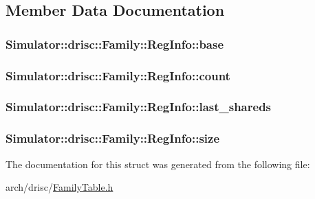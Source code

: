 \subsection{Member Data Documentation}
\hypertarget{struct_simulator_1_1drisc_1_1_family_1_1_reg_info_af6db1a141f61cce61b2f2dd993d227de}{
\subsubsection[{base}]{ Simulator\+::drisc\+::\+Family\+::\+Reg\+Info\+::base}}\label{struct_simulator_1_1drisc_1_1_family_1_1_reg_info_af6db1a141f61cce61b2f2dd993d227de}
\hypertarget{struct_simulator_1_1drisc_1_1_family_1_1_reg_info_acc2ad70f3b688fa40795ba2289115970}{
\subsubsection[{count}]{ Simulator\+::drisc\+::\+Family\+::\+Reg\+Info\+::count}}\label{struct_simulator_1_1drisc_1_1_family_1_1_reg_info_acc2ad70f3b688fa40795ba2289115970}
\hypertarget{struct_simulator_1_1drisc_1_1_family_1_1_reg_info_ae04720534956ec61ba4fad57b8e274ea}{
\subsubsection[{last\+\_\+shareds}]{ Simulator\+::drisc\+::\+Family\+::\+Reg\+Info\+::last\+\_\+shareds}}\label{struct_simulator_1_1drisc_1_1_family_1_1_reg_info_ae04720534956ec61ba4fad57b8e274ea}
\hypertarget{struct_simulator_1_1drisc_1_1_family_1_1_reg_info_a8edcf21621164c20c10cdc1babc1112e}{
\subsubsection[{size}]{ Simulator\+::drisc\+::\+Family\+::\+Reg\+Info\+::size}}\label{struct_simulator_1_1drisc_1_1_family_1_1_reg_info_a8edcf21621164c20c10cdc1babc1112e}


The documentation for this struct was generated from the following file\+:\begin{DoxyCompactItemize}
\item 
arch/drisc/\hyperlink{_family_table_8h}{Family\+Table.\+h}\end{DoxyCompactItemize}
